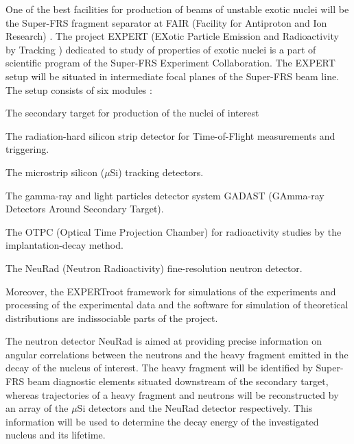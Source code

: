 \documentclass{webofc}
\newcommand{\red}[1]{\textcolor{red}{#1}}
\begin{document}
One of the best facilities for production of beams of unstable exotic nuclei will be the Super-FRS fragment separator at FAIR (Facility for Antiproton and Ion Research) \cite{diplom}. The project EXPERT (EXotic Particle Emission and Radioactivity by Tracking \cite{IMexpert}) dedicated to study of properties of exotic nuclei is a part of scientific program of the Super-FRS Experiment Collaboration. The EXPERT setup will be situated in intermediate focal planes of the Super-FRS beam line. The setup consists of six modules \cite{tdr}:
\begin{inparaenum}[(i)]
	\item The secondary target for production of the nuclei of interest
	\item The radiation-hard silicon strip detector for Time-of-Flight measurements and triggering.
	\item The microstrip silicon ($\mu$Si) tracking detectors.
	\item The gamma-ray and light particles detector system GADAST (GAmma-ray Detectors Around Secondary Target).
	\item The OTPC (Optical Time Projection Chamber) for radioactivity studies by the implantation-decay method.
	\item The NeuRad (Neutron Radioactivity) fine-resolution neutron detector.
\end{inparaenum}

Moreover, the EXPERTroot framework \cite{er} for simulations of the experiments and processing of the experimental data and the software for simulation of theoretical distributions are indissociable parts of the project.



The neutron detector NeuRad is aimed at providing precise information on angular correlations between the neutrons and the heavy fragment emitted in the decay of the nucleus of interest. The heavy fragment will be identified by Super-FRS beam diagnostic elements situated downstream of the secondary target, whereas trajectories of a heavy fragment and neutrons will be reconstructed by an array of the $\mu$Si detectors and the NeuRad detector respectively. This information will be used to determine the decay energy of the investigated nucleus and its lifetime.
\end{document}
